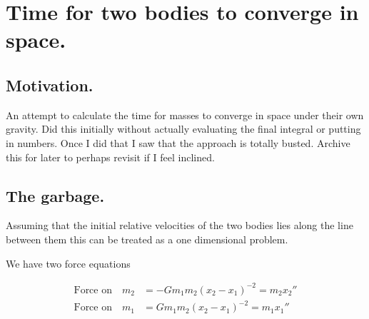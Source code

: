 
%
%




\chapter{Time for two bodies to converge in space. }

%



\section{Motivation.}

An attempt to calculate the time for masses to converge in space under their own gravity.  Did this initially without actually evaluating the final
integral or putting in numbers.  Once I did that I saw that the approach is totally busted.  Archive this for later to perhaps revisit if I feel
inclined.

\section{The garbage. }

Assuming that the initial relative velocities of the two bodies lies along
the line between them this can be treated as a one dimensional problem.

We have two force equations

\begin{align*}
\text{Force on} \quad m_2 &= - G m_1 m_2 (x_2 - x_1)^{-2} = m_2 {x_2}'' \\
\text{Force on} \quad m_1 &=  G m_1 m_2 (x_2 - x_1)^{-2} = m_1 {x_1}''
\end{align*}


